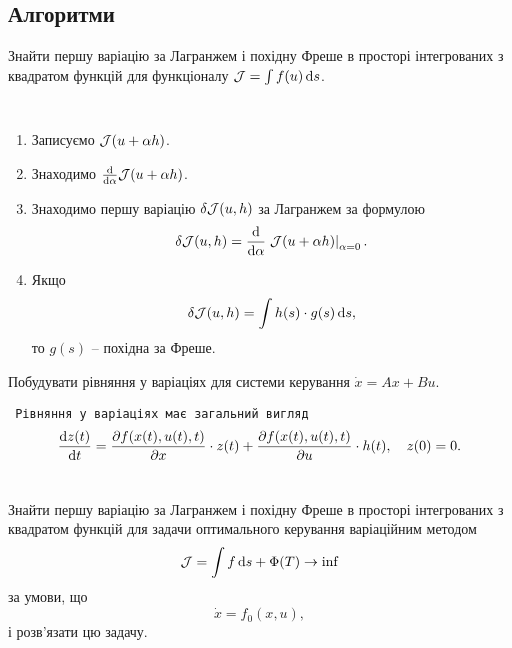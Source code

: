 \subsection{Алгоритми}

\begin{problem*}
	Знайти першу варіацію за Лагранжем і похідну Фреше в просторі інтегрованих з квадратом функцій для функціоналу $\mathcal{J} = \int f(u) \mathop{}\!\mathrm{d} s$.
\end{problem*}

\begin{algorithm} \tt
	\begin{enumerate}
		\item Записуємо $\mathcal{J}(u + \alpha h)$.
		\item Знаходимо $\frac{\mathop{}\!\mathrm{d}}{\mathop{}\!\mathrm{d} \alpha} \mathcal{J}(u + \alpha h)$.
		\item Знаходимо першу варіацію $\delta \mathcal{J} (u, h)$ за Лагранжем за формулою \[ \delta \mathcal{J}(u, h) = \frac{\mathop{}\!\mathrm{d}}{\mathop{}\!\mathrm{d} \alpha} \left.\mathcal{J}(u + \alpha h)\right|_{\alpha = 0}. \]
		\item Якщо \[\delta \mathcal{J} (u, h) = \int h(s) \cdot g(s) \mathop{}\!\mathrm{d} s,\] то $g(s)$ -- похідна за Фреше.
	\end{enumerate}
\end{algorithm}

\begin{problem*}
	Побудувати рівняння у варіаціях для системи керування $\dot x = A x + B u$.
\end{problem*}

\begin{algorithm} \tt
	Рівняння у варіаціях має загальний вигляд \[ \frac{\mathop{}\!\mathrm{d} z(t)}{\mathop{}\!\mathrm{d} t} = \frac{\partial f(x(t),u(t),t)}{\partial x} \cdot z(t) + \frac{\partial f(x(t),u(t),t)}{\partial u} \cdot h(t), \quad z(0) = 0. \]
\end{algorithm}

\begin{problem*}
	Знайти першу варіацію за Лагранжем і похідну Фреше в просторі інтегрованих з квадратом функцій для задачи оптимального керування варіаційним методом \[ \mathcal{J} = \int f \mathop{}\!\mathrm{d} s + \Phi(T) \to \inf \] за умови, що \[ \dot x = f_0 (x, u), \] і розв'язати цю задачу.
\end{problem*}

